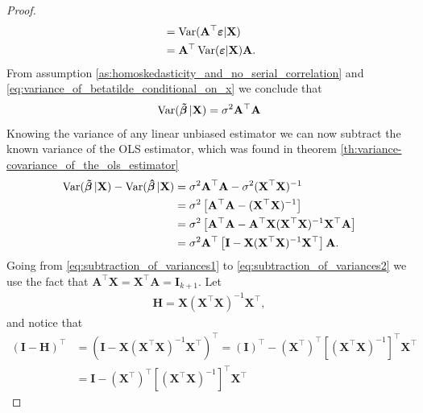 \begin{proof}
\begin{align}
        &= \operatorname{\text{Var}}(\mathbf{A}^\top\boldsymbol{\varepsilon}|\mathbf{X}) \nonumber\\
        &= \mathbf{A}^\top\operatorname{\text{Var}}(\boldsymbol{\varepsilon}|\mathbf{X})\mathbf{A}.\label{eq:variance_of_betatilde_conditional_on_x}
    \end{align}
    From assumption \ref{as:homoskedasticity_and_no_serial_correlation} and \eqref{eq:variance_of_betatilde_conditional_on_x} we conclude that
    \begin{align}
        \operatorname{\text{Var}}(\operatorname{\boldsymbol{\Tilde{\beta}}}|\mathbf{X}) = \sigma^2\mathbf{A}^\top\mathbf{A}
    \end{align}
    Knowing the variance of any linear unbiased estimator we can now subtract the known variance of the OLS estimator, which was found in theorem \ref{th:variance-covariance_of_the_ols_estimator}
    \begin{align}
        \operatorname{\text{Var}}(\operatorname{\boldsymbol{\Tilde{\beta}}}|\mathbf{X}) - \operatorname{\text{Var}}(\operatorname{\boldsymbol{\hat{\beta}}}|\mathbf{X}) &= \sigma^2\mathbf{A}^\top\mathbf{A} - \sigma^2(\mathbf{X}^\top\mathbf{X})^{-1} \nonumber \\
        &= \sigma^2\left[\mathbf{A}^\top\mathbf{A} - (\mathbf{X}^\top\mathbf{X})^{-1} \right] \label{eq:subtraction_of_variances1} \\
        &= \sigma^2\left[\mathbf{A}^\top\mathbf{A} - \mathbf{A}^\top\mathbf{X}(\mathbf{X}^\top\mathbf{X})^{-1}\mathbf{X}^\top\mathbf{A} \right] \label{eq:subtraction_of_variances2} \\
        &= \sigma^2\mathbf{A}^\top\left[\mathbf{I} - \mathbf{X}(\mathbf{X}^\top\mathbf{X})^{-1}\mathbf{X}^\top \right]\mathbf{A}.\label{eq:subtraction_of_variances3}
    \end{align}
    Going from \eqref{eq:subtraction_of_variances1} to \eqref{eq:subtraction_of_variances2} we use the fact that $\mathbf{A}^\top\mathbf{X} = \mathbf{X}^\top\mathbf{A} = \mathbf{I}_{k+1}$.
    Let 
    \begin{align}\label{eq:projection_matrix}
    \mathbf{H} = \mathbf{X}(\mathbf{X}^\top\mathbf{X})^{-1}\mathbf{X}^\top,
    \end{align}
    and notice that
    \begin{align*}
        \left(\mathbf{I} - \mathbf{H}\right)^\top &= (\mathbf{I} - \mathbf{X}(\mathbf{X}^\top\mathbf{X})^{-1}\mathbf{X}^\top)^\top 
        = (\mathbf{I})^\top - \left(\mathbf{X}^\top\right)^\top\left[(\mathbf{X}^\top\mathbf{X})^{-1}\right]^\top\mathbf{X}^\top \\
        &= \mathbf{I} - \left(\mathbf{X}^\top\right)^\top\left[(\mathbf{X}^\top\mathbf{X})^{-1}\right]^\top\mathbf{X}^\top

\end{align*}
\end{proof}
